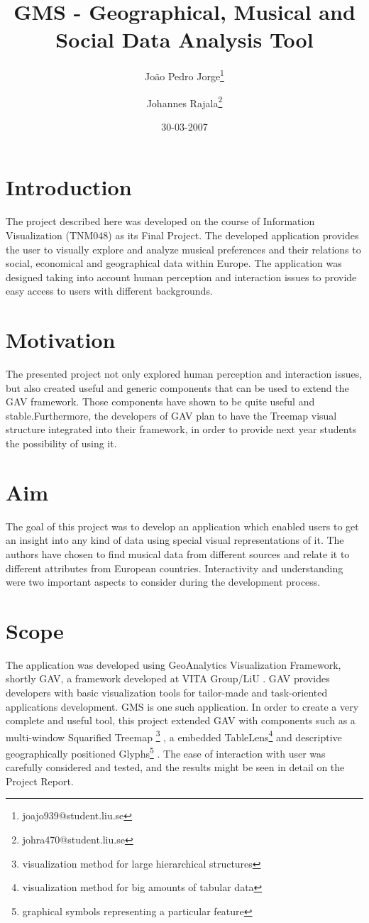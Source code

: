 \documentclass[twocolumn,8pt]{article}
\title{GMS - Geographical, Musical and Social Data Analysis Tool}
\author{Jo\~{a}o Pedro Jorge\thanks{joajo939@student.liu.se} \and Johannes Rajala\thanks{johra470@student.liu.se}}
\date{30-03-2007}
\begin{document}
\small
\maketitle

\section{Introduction}

The project described here was developed on the course of Information Visualization (TNM048) \cite{InfoVis} as its Final Project. The developed application provides the user to visually explore and analyze musical preferences and their relations to social, economical and geographical data within Europe. The application was designed taking into account human perception and interaction issues to provide easy access to users with different backgrounds.

\section{Motivation}
The presented project not only explored human perception and interaction issues, but also created useful and generic components that can be used to extend the GAV framework. Those components have shown to be quite useful and stable.Furthermore, the developers of GAV plan to have the Treemap visual structure integrated into their framework, in order to provide next year students the possibility of using it.

\section{Aim}
The goal of this project was to develop an application which enabled users to get an insight into any kind of data using special visual representations of it. The authors have chosen to find musical data from different sources and relate it to different attributes from European countries. Interactivity and understanding were two important aspects to consider during the development process.

\section{Scope}

The application was developed using GeoAnalytics Visualization Framework, shortly GAV, a framework developed at VITA Group/LiU \cite{GAV}. GAV provides developers with basic visualization tools for tailor-made and task-oriented applications development. GMS is one such application. In order to create a very complete and useful tool, this project extended GAV with components such as a multi-window Squarified Treemap \footnote{visualization method for large hierarchical
structures} \cite{Treemap, Panopticon}, a embedded TableLens\footnote{visualization method for big amounts of tabular data} and descriptive geographically positioned Glyphs\footnote{graphical symbols representing a particular feature} \cite{InfoVis}.
The ease of interaction with user was carefully considered and tested, and the results might be seen in detail on the Project Report.
\end{document}
